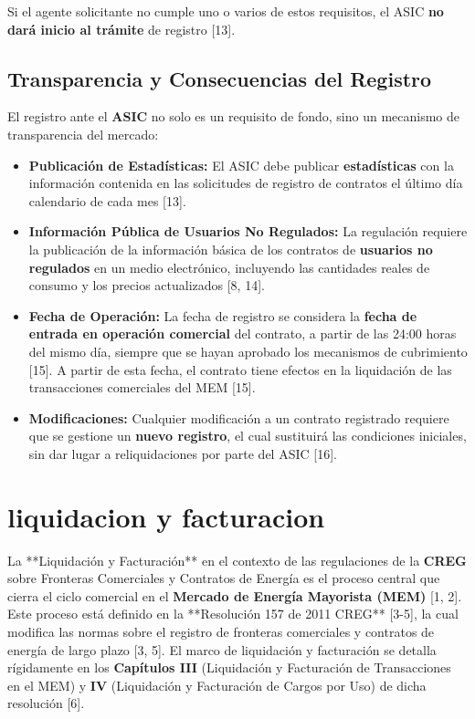 \documentclass[a5paper]{book}%
\begin{document}
Si el agente solicitante no cumple uno o varios de estos requisitos, el ASIC \textbf{no dará inicio al trámite} de registro [13].

\subsection{Transparencia y Consecuencias del Registro}

El registro ante el \textbf{ASIC} no solo es un requisito de fondo, sino un mecanismo de transparencia del mercado:

\begin{itemize}
	\item \textbf{Publicación de Estadísticas:} El ASIC debe publicar \textbf{estadísticas} con la información contenida en las solicitudes de registro de contratos el último día calendario de cada mes [13].
	\item \textbf{Información Pública de Usuarios No Regulados:} La regulación requiere la publicación de la información básica de los contratos de \textbf{usuarios no regulados} en un medio electrónico, incluyendo las cantidades reales de consumo y los precios actualizados [8, 14].
	\item \textbf{Fecha de Operación:} La fecha de registro se considera la \textbf{fecha de entrada en operación comercial} del contrato, a partir de las 24:00 horas del mismo día, siempre que se hayan aprobado los mecanismos de cubrimiento [15]. A partir de esta fecha, el contrato tiene efectos en la liquidación de las transacciones comerciales del MEM [15].
	\item \textbf{Modificaciones:} Cualquier modificación a un contrato registrado requiere que se gestione un \textbf{nuevo registro}, el cual sustituirá las condiciones iniciales, sin dar lugar a reliquidaciones por parte del ASIC [16].
\end{itemize}


\section{liquidacion y facturacion}

La **Liquidación y Facturación** en el contexto de las regulaciones de la \textbf{CREG} sobre Fronteras Comerciales y Contratos de Energía es el proceso central que cierra el ciclo comercial en el \textbf{Mercado de Energía Mayorista (MEM)} [1, 2]. Este proceso está definido en la **Resolución 157 de 2011 CREG** [3-5], la cual modifica las normas sobre el registro de fronteras comerciales y contratos de energía de largo plazo [3, 5]. El marco de liquidación y facturación se detalla rígidamente en los \textbf{Capítulos III} (Liquidación y Facturación de Transacciones en el MEM) y \textbf{IV} (Liquidación y Facturación de Cargos por Uso) de dicha resolución [6].
\end{document}
